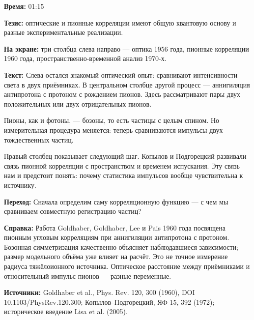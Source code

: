 \textbf{Время:} 01:15

\textbf{Тезис:} оптические и пионные корреляции имеют общую квантовую основу и разные экспериментальные реализации.

\textbf{На экране:} три столбца слева направо — оптика 1956 года, пионные корреляции 1960 года, пространственно-временной анализ 1970-х.

\textbf{Текст:} Слева остался знакомый оптический опыт: сравнивают интенсивности света в двух приёмниках. В центральном столбце другой процесс — аннигиляция антипротона с протоном с рождением пионов. Здесь рассматривают пары двух положительных или двух отрицательных пионов.

Пионы, как и фотоны, — бозоны, то есть частицы с целым спином. Но измерительная процедура меняется: теперь сравниваются импульсы двух тождественных частиц.

Правый столбец показывает следующий шаг. Копылов и Подгорецкий развивали связь пионной корреляции с пространством и временем испускания. Эту связь нам и предстоит понять: почему статистика импульсов вообще чувствительна к источнику.

\textbf{Переход:} Сначала определим саму корреляционную функцию — с чем мы сравниваем совместную регистрацию частиц?

\textbf{Справка:} Работа Goldhaber, Goldhaber, Lee и Pais 1960 года посвящена пионным угловым корреляциям при аннигиляции антипротона с протоном. Бозонная симметризация качественно объясняет наблюдавшиеся зависимости; размер модельного объёма уже влияет на расчёт. Это не точное измерение радиуса тяжёлоионного источника. Оптическое расстояние между приёмниками и относительный импульс пионов — разные переменные.

\textbf{Источники:} Goldhaber et al., Phys. Rev. 120, 300 (1960), DOI 10.1103/PhysRev.120.300; Копылов–Подгорецкий, ЯФ 15, 392 (1972); историческое введение Lisa et al. (2005).
